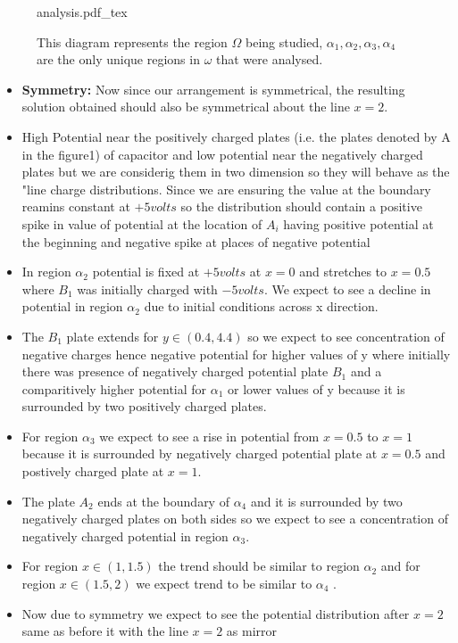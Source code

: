 \begin{figure}[ht]
    \centering
    \def\svgwidth{0.5\textwidth}
    {analysis.pdf_tex}
    \caption{This diagram represents the region $\Omega$ being studied, $\alpha_1,\alpha_2,\alpha_3,\alpha_4$ are the only unique regions in $\omega$ that were analysed.}
    \label{}
\end{figure}
\begin{itemize}
    \item \textbf{Symmetry: } Now since  our arrangement is symmetrical, the resulting solution obtained should also be symmetrical about the line $x = 2$. 
    \item High Potential near the positively charged plates (i.e. the plates denoted by A  in the figure1) of capacitor and low potential near the negatively charged plates but we are considerig them in two dimension so they will behave as the "line charge distributions. Since we are ensuring the value at the boundary reamins constant at $ +5 volts $ so the distribution should contain a positive spike in value of potential at the location of $A_i$  having positive potential at the beginning and negative spike at places of negative potential
    \item  In region $ \alpha_2 $ potential is fixed at $ + 5 volts $ at $ x = 0 $ and stretches to $ x = 0.5 $ where $ B_1 $ was initially charged with $ - 5 volts $. We expect to see a decline in potential in region $ \alpha_2 $ due to initial conditions across x direction.
    \item The  $ B_1 $ plate extends for $ y \in (0.4, 4.4)  $ so we expect to see concentration of negative charges hence negative potential  for  higher values  of y where initially there was presence of negatively charged potential plate $ B_1 $ and a comparitively higher potential for $ \alpha_1 $ or lower values of y because it is surrounded by two positively charged plates.
    \item For region $ \alpha_3   $  we expect to see a rise  in potential from $ x = 0.5 $ to $ x = 1 $  because it is surrounded by negatively charged potential plate at $ x = 0.5 $ and postively charged plate at  $ x = 1 $.
    \item The plate $ A_2 $ ends at the boundary of $ \alpha_4 $ and it is surrounded by two negatively charged plates on both sides so we expect to see a concentration of negatively charged potential in region $ \alpha_3 $.
    \item For region $ x \in (1 , 1.5) $ the trend should be similar to region $ \alpha_2 $ and for region $ x \in (1.5, 2) $ we expect  trend to be similar to $ \alpha_4 $ . 
    \item Now due to symmetry we expect to see the potential distribution after $ x = 2 $ same as before it with the line $ x = 2 $ as mirror
\end{itemize}

